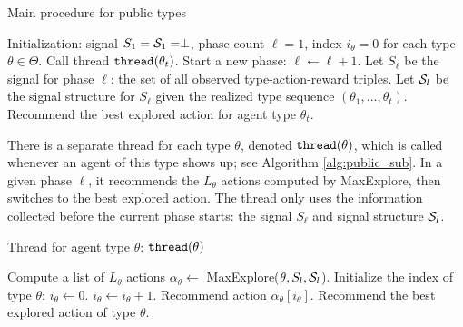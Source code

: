  \begin{algorithm}[t]
    \caption{Main procedure for public types }
    	\label{alg:public_main}
    \begin{algorithmic}[1]
    \STATE Initialization: signal $S_1 = \S_1 = \perp$,
             phase count $\ell = 1$, index $i_{\theta} = 0$ for each type $\theta \in \varTheta$.
		\IF {$\ell \leq |\A|\cdot |\varTheta|$}
		 \STATE {}
		Call thread $\thread(\theta_t)$.
				\STATE Start a new phase: $\ell \leftarrow \ell + 1$.
				\STATE Let $S_\ell$ be the signal for phase $\ell$: 
                 the set of all observed type-action-reward triples.
        \STATE Let $\S_\ell$ be the signal structure for $S_\ell$ given the realized type sequence $(\theta_1,...,\theta_t)$.
			\ENDIF
		\ELSE
			\STATE {}
			Recommend the best explored action for agent type $\theta_t$.
		\ENDIF
	\ENDFOR
     \end{algorithmic}
\end{algorithm}

There is a separate thread for each type $\theta$, denoted $\thread(\theta)$,  which is called whenever an agent of this type shows up; see Algorithm \ref{alg:public_sub}. In a given phase $\ell$, it recommends the $L_{\theta}$ actions computed by MaxExplore, then switches to the best explored action. The thread only uses the information collected before the current phase starts: the signal $S_\ell$ and signal structure $\S_\ell$.

 \begin{algorithm}[h]
    \caption{Thread for agent type $\theta$: $\thread(\theta)$ }
    	\label{alg:public_sub}
    \begin{algorithmic}[1]
			\STATE Compute a list of $L_{\theta}$ actions $\alpha_{\theta} \leftarrow $ MaxExplore($\theta, S_\ell, \S_\ell$).
			\STATE Initialize the index of type $\theta$: $i_{\theta} \leftarrow 0$.
		\ENDIF
		\STATE $i_{\theta} \leftarrow i_{\theta} + 1$.
			\STATE Recommend action $\alpha_{\theta} [i_{\theta}]$.
		\ELSE
			\STATE Recommend the best explored action of type $\theta$.
		\ENDIF
     \end{algorithmic}
\end{algorithm}

